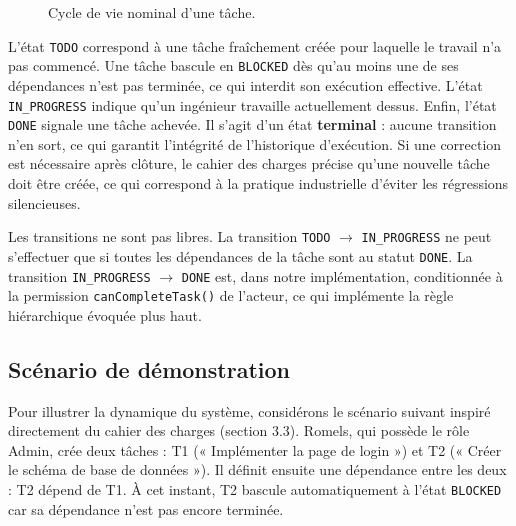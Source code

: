 \documentclass[11pt]{article}
\begin{document}
\begin{figure}[H]
    \centering
    \caption{Cycle de vie nominal d'une tâche.}
\end{figure}

L'état \texttt{TODO} correspond à une tâche fraîchement créée pour laquelle
le travail n'a pas commencé. Une tâche bascule en \texttt{BLOCKED} dès
qu'au moins une de ses dépendances n'est pas terminée, ce qui interdit son
exécution effective. L'état \texttt{IN\_PROGRESS} indique qu'un ingénieur
travaille actuellement dessus. Enfin, l'état \texttt{DONE} signale une
tâche achevée. Il s'agit d'un état \textbf{terminal} : aucune transition
n'en sort, ce qui garantit l'intégrité de l'historique d'exécution. Si une
correction est nécessaire après clôture, le cahier des charges précise
qu'une nouvelle tâche doit être créée, ce qui correspond à la pratique
industrielle d'éviter les régressions silencieuses.

Les transitions ne sont pas libres. La transition \texttt{TODO}
$\rightarrow$ \texttt{IN\_PROGRESS} ne peut s'effectuer que si toutes les
dépendances de la tâche sont au statut \texttt{DONE}. La transition
\texttt{IN\_PROGRESS} $\rightarrow$ \texttt{DONE} est, dans notre
implémentation, conditionnée à la permission \texttt{canCompleteTask()} de
l'acteur, ce qui implémente la règle hiérarchique évoquée plus haut.

\subsection{Scénario de démonstration}
Pour illustrer la dynamique du système, considérons le scénario suivant
inspiré directement du cahier des charges (section 3.3). Romels, qui
possède le rôle Admin, crée deux tâches : T1 (« Implémenter la page de
login ») et T2 (« Créer le schéma de base de données »). Il définit
ensuite une dépendance entre les deux : T2 dépend de T1. À cet instant,
T2 bascule automatiquement à l'état \texttt{BLOCKED} car sa dépendance
n'est pas encore terminée.
\end{document}

